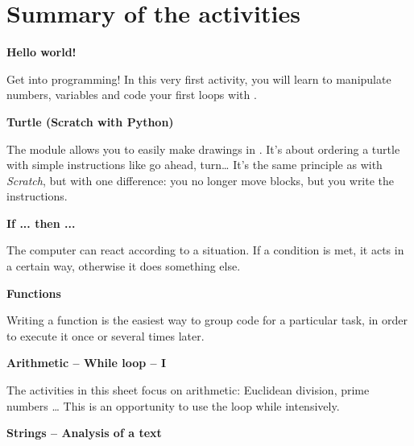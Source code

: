 \cleardoublepage
\thispagestyle{empty}
\tableofcontents


\newpage


\section*{Summary of the activities}


\newcommand{\titreactivite}[1]{{\textbf{#1}}\nopagebreak}
\newcommand{\descriptionactivite}[1]{%
\smallskip\hfill
\begin{minipage}{0.95\textwidth}\small#1\end{minipage}\medskip\smallskip}

\titreactivite{Hello world!}

\descriptionactivite{Get into programming! In this very first activity, you will learn to manipulate numbers, variables and code your first loops with \Python.}

\titreactivite{Turtle (Scratch with Python)}

\descriptionactivite{The module  allows you to easily make drawings in \Python. It's about ordering a turtle with simple instructions like \og{}go ahead\fg{}, \og{}turn\fg{}\ldots{} It's the same principle as with \emph{Scratch}, but with one difference: you no longer move blocks, but you write the instructions.}

\titreactivite{If ... then ...}

\descriptionactivite{The computer can react according to a situation. 
If a condition is met, it acts in a certain way, otherwise it does something else.}

\titreactivite{Functions}

\descriptionactivite{Writing a function is the easiest way to group code for a particular task, in order to execute it once or several times later.}

\titreactivite{Arithmetic -- While loop -- I}

\descriptionactivite{The activities in this sheet focus on arithmetic: Euclidean division, prime numbers \ldots{} This is an opportunity to use the loop \og{}while\fg{} intensively.}

\titreactivite{Strings -- Analysis of a text}

